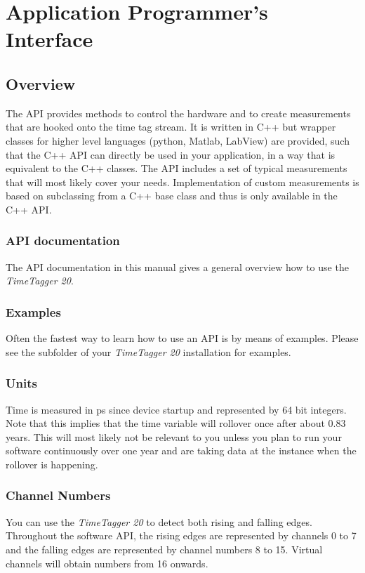 \documentclass[letterpaper,10pt,english]{sphinxmanual}
\begin{document}
\chapter{Application Programmer's Interface}
\label{sections/api:api}\label{sections/api::doc}\label{sections/api:application-programmer-s-interface}

\section{Overview}
\label{sections/api:overview}
The API provides methods to control the hardware and to create
measurements that are hooked onto the time tag stream. It is written in C++ but
wrapper classes for higher level languages (python, Matlab, LabView)
are provided, such that the C++ API can directly be used in your application,
in a way that is equivalent to the C++ classes.
The API includes a set of typical measurements that will most likely
cover your needs. Implementation of custom measurements is based on
subclassing from a C++ base class and thus is only available in the C++ API.


\subsection{API documentation}
\label{sections/api:api-documentation}
The API documentation in this manual gives a general overview how to use the \emph{TimeTagger 20}.


\subsection{Examples}
\label{sections/api:examples}
Often the fastest way to learn how to use an API is by means of examples. Please see the 
subfolder of your \emph{TimeTagger 20} installation for examples.


\subsection{Units}
\label{sections/api:units}
Time is measured in ps since device startup and represented by 64 bit integers. Note that this
implies that the time variable will rollover once after about 0.83 years. This
will most likely not be relevant to you unless you plan to run your software
continuously over one year and are taking data at the instance when the rollover is happening.


\subsection{Channel Numbers}
\label{sections/api:channel-numbers}
You can use the \emph{TimeTagger 20} to detect both rising and falling edges. Throughout
the software API, the rising edges are represented by channels 0 to 7 and
the falling edges are represented by channel numbers 8 to 15. Virtual channels will obtain numbers
from 16 onwards.
\end{document}
